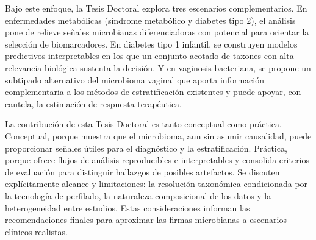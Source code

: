 Bajo este enfoque, la Tesis Doctoral explora tres escenarios complementarios. En enfermedades metabólicas (síndrome metabólico y diabetes tipo 2), el análisis pone de relieve señales microbianas diferenciadoras con potencial para orientar la selección de biomarcadores. En diabetes tipo 1 infantil, se construyen modelos predictivos interpretables en los que un conjunto acotado de taxones con alta relevancia biológica sustenta la decisión. Y en vaginosis bacteriana, se propone un subtipado alternativo del microbioma vaginal que aporta información complementaria a los métodos de estratificación existentes y puede apoyar, con cautela, la estimación de respuesta terapéutica. 

La contribución de esta Tesis Doctoral es tanto conceptual como práctica. Conceptual, porque muestra que el microbioma, aun sin asumir causalidad, puede proporcionar señales útiles para el diagnóstico y la estratificación. Práctica, porque ofrece flujos de análisis reproducibles e interpretables y consolida criterios de evaluación para distinguir hallazgos de posibles artefactos. Se discuten explícitamente alcance y limitaciones: la resolución taxonómica condicionada por la tecnología de perfilado, la naturaleza composicional de los datos y la heterogeneidad entre estudios. Estas consideraciones informan las recomendaciones finales para aproximar las firmas microbianas a escenarios clínicos realistas.